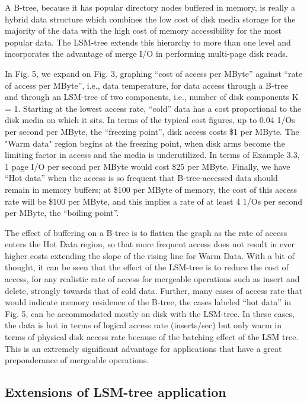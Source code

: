 \documentclass[a4paper,12pt,notitlepage,twoside,openright]{article}
\begin{document}
A B-tree, because it has popular directory nodes buffered in memory, is
really a hybrid data structure which combines the low cost of disk media
storage for the majority of the data with the high cost of memory
accessibility for the most popular data. The LSM-tree extends this
hierarchy to more than one level and incorporates the advantage of merge
I/O in performing multi-page disk reads.

In Fig. 5, we expand on Fig. 3, graphing ``cost of access per MByte''
against ``rate of access per MByte'', i.e., data temperature, for data
access through a B-tree and through an LSM-tree of two components, i.e.,
number of disk components K = 1. Starting at the lowest access rate,
``cold'' data has a cost proportional to the disk media on which it sits.
In terms of the typical cost figures, up to 0.04 1/Os per second per
MByte, the ``freezing point'', disk access costs \$1 per MByte. The "Warm
data" region begins at the freezing point, when disk arms become the
limiting factor in access and the media is underutilized. In terms of
Example 3.3, 1 page I/O per second per MByte would cost \$25 per MByte.
Finally, we have ``Hot data'' when the access is so frequent that
B-tree-accessed data should remain in memory buffers; at \$100 per MByte
of memory, the cost of this access rate will be \$100 per MByte, and
this implies a rate of at least 4 1/Os per second per MByte, the
``boiling point''.

The effect of buffering on a B-tree is to flatten the graph as the rate
of access enters the Hot Data region, so that more frequent access does
not result in ever higher costs extending the slope of the rising line
for Warm Data. With a bit of thought, it can be seen that the effect of
the LSM-tree is to reduce the cost of access, for any realistic rate of
access for mergeable operations such as insert and delete, strongly
towards that of cold data. Further, many cases of access rate that would
indicate memory residence of the B-tree, the cases labeled ``hot data'' in
Fig. 5, can be accommodated mostly on disk with the LSM-tree. In these
cases, the data is hot in terms of logical access rate (inserts/sec) but
only warm in terms of physical disk access rate because of the batching
effect of the LSM tree. This is an extremely significant advantage for
applications that have a great preponderance of mergeable operations.


\hypertarget{extensions-of-lsm-tree-application}{%
\subsection{Extensions of LSM-tree
application}\label{extensions-of-lsm-tree-application}}
\end{document}
